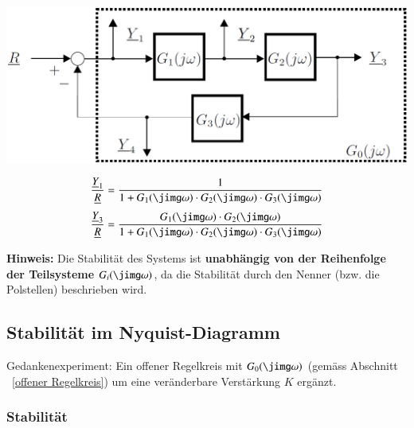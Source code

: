 \begin{minipage}[c]{0.5\columnwidth}
    \includegraphics[width=\columnwidth]{images/kreisschaltung_mehrere_bloecke.png}
\end{minipage}
\hfill
\begin{minipage}[c]{0.48\columnwidth}
    $$ \frac{\underline{Y}_1}{\underline{R}} = \frac{1}{1 + G_1(\jimg \omega) \cdot G_2(\jimg \omega) \cdot G_3(\jimg \omega)} $$
    $$ \frac{\underline{Y}_3}{\underline{R}} = \frac{G_1(\jimg \omega) \cdot G_2(\jimg \omega)}{1 + G_1(\jimg \omega) \cdot G_2(\jimg \omega) \cdot G_3(\jimg \omega)} $$
\end{minipage}

\vspace{0.2cm}
\textbf{Hinweis:} Die Stabilität des Systems ist \textbf{unabhängig von der Reihenfolge der Teilsysteme} $G_{i}(\jimg \omega)$,
da die Stabilität durch den Nenner (bzw. die Polstellen) beschrieben wird.


\subsection{Stabilität im Nyquist-Diagramm}

Gedankenexperiment: Ein offener Regelkreis mit $G_0(\jimg \omega)$ (gemäss Abschnitt ~\ref{offener Regelkreis}) um eine 
veränderbare Verstärkung $K$ ergänzt.


\subsubsection{Stabilität}

